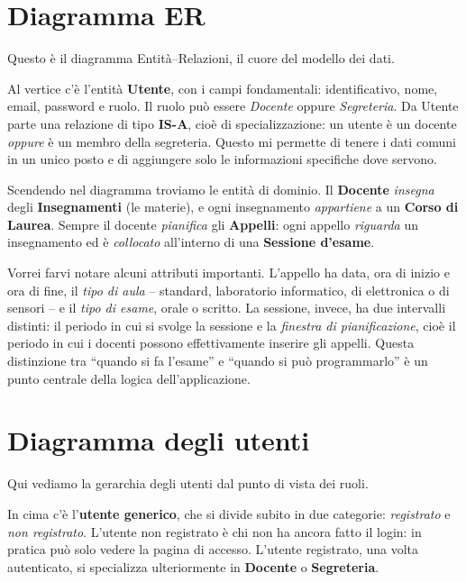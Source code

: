 \documentclass[11pt]{article}
\begin{document}
\section*{Diagramma ER}

Questo è il diagramma Entità--Relazioni, il cuore del modello dei dati.

Al vertice c'è l'entità \textbf{Utente}, con i campi fondamentali: identificativo, nome,
email, password e ruolo. Il ruolo può essere \emph{Docente} oppure \emph{Segreteria}.
Da Utente parte una relazione di tipo \textbf{IS-A}, cioè di specializzazione: un utente
è un docente \emph{oppure} è un membro della segreteria. Questo mi permette di tenere i
dati comuni in un unico posto e di aggiungere solo le informazioni specifiche dove servono.

Scendendo nel diagramma troviamo le entità di dominio. Il \textbf{Docente}
\emph{insegna} degli \textbf{Insegnamenti} (le materie), e ogni insegnamento
\emph{appartiene} a un \textbf{Corso di Laurea}. Sempre il docente \emph{pianifica} gli
\textbf{Appelli}: ogni appello \emph{riguarda} un insegnamento ed è \emph{collocato}
all'interno di una \textbf{Sessione d'esame}.

Vorrei farvi notare alcuni attributi importanti. L'appello ha data, ora di inizio e ora
di fine, il \emph{tipo di aula} -- standard, laboratorio informatico, di elettronica o
di sensori -- e il \emph{tipo di esame}, orale o scritto. La sessione, invece, ha due
intervalli distinti: il periodo in cui si svolge la sessione e la \emph{finestra di
pianificazione}, cioè il periodo in cui i docenti possono effettivamente inserire gli
appelli. Questa distinzione tra ``quando si fa l'esame'' e ``quando si può programmarlo''
è un punto centrale della logica dell'applicazione.

\section*{Diagramma degli utenti}

Qui vediamo la gerarchia degli utenti dal punto di vista dei ruoli.

In cima c'è l'\textbf{utente generico}, che si divide subito in due categorie:
\emph{registrato} e \emph{non registrato}. L'utente non registrato è chi non ha ancora
fatto il login: in pratica può solo vedere la pagina di accesso. L'utente registrato,
una volta autenticato, si specializza ulteriormente in \textbf{Docente} o
\textbf{Segreteria}.
\end{document}
